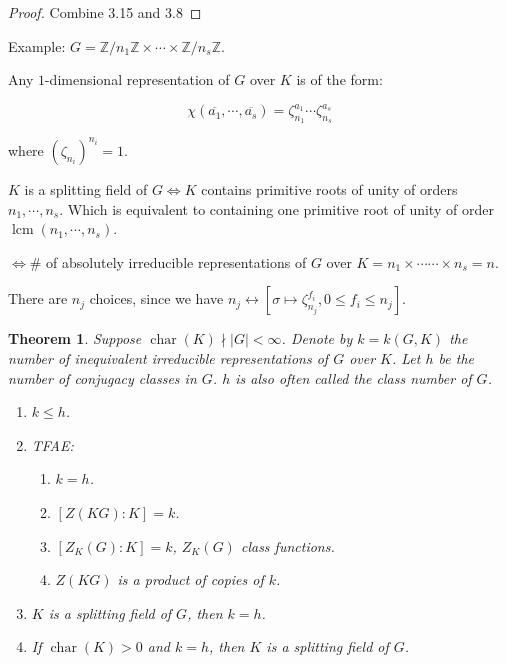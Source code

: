 \documentclass{article}
\theoremstyle{definition}
\theoremstyle{plain}
\newtheorem{theorem}{Theorem}[section]
\theoremstyle{remark}
\begin{document}
    \begin{proof}
        Combine 3.15 and 3.8
    \end{proof}

    Example: \(G = \mathbb{Z} / n_1 \mathbb{Z} \times \cdots \times \mathbb{Z} / n_s \mathbb{Z}\).

    Any \(1\)-dimensional representation of \(G\) over \(K\) is of the form:

    \[
        \chi(\overline{a_1}, \cdots , \overline{a_s}) = \zeta_{n_1}^{a_1} \cdots \zeta_{n_s}^{a_s}
    \]

    where \((\zeta_{n_i})^{n_i} = 1\).

    \(K\) is a splitting field of \(G \iff K\) contains primitive roots of unity of orders \(n_1 , \cdots , n_s\). Which is equivalent to containing one primitive root of unity of order \(\operatorname{lcm}(n_1 , \cdots , n_s)\).

    \(\iff \#\) of absolutely irreducible representations of \(G\) over \(K = n_1 \times \cdots \cdots \times n_s = n\).

    There are \(n_j\) choices, since we have \(n_j \leftrightarrow [\sigma \mapsto \zeta_{n_j}^{f_i}, 0 \leq f_i \leq n_j]\). 

    \begin{theorem}
        Suppose \(\operatorname{char}(K) \nmid \vert G \vert < \infty\). Denote by \(k = k(G,K)\) the number of inequivalent irreducible representations of \(G\) over \(K\). Let \(h\) be the number of conjugacy classes in \(G\). \(h\) is also often called the class number of \(G\).

        \begin{enumerate}[label=\roman*)]
            \item \(k \leq h\).
            \item TFAE: \begin{enumerate}[label=\alph*)]
                \item \(k = h\).
                \item \([Z(KG):K] = k\).
                \item \([Z_K(G):K] =  k\), \(Z_K(G)\) class functions.
                \item \(Z(KG)\) is a product of copies of \(k\).   
            \end{enumerate}
            
            \item \(K\) is a splitting field of \(G\), then \(k = h\).
            \item If \(\operatorname{char}(K) > 0\) and \(k = h\), then \(K\) is a splitting field of \(G\).
        \end{enumerate} 
    \end{theorem}
\end{document}
